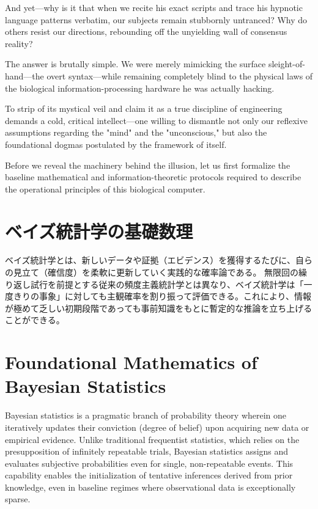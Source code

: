     And yet—why is it that when we recite his exact scripts and trace his hypnotic language patterns verbatim, our subjects remain stubbornly untranced? Why do others resist our directions, rebounding off the unyielding wall of consensus reality?

    The answer is brutally simple.
    We were merely mimicking the surface sleight-of-hand—the overt syntax—while remaining completely blind to the physical laws of the biological information-processing hardware he was actually hacking.

    To strip \abbrNLP of its mystical veil and claim it as a true discipline of engineering demands a cold, critical intellect—one willing to dismantle not only our reflexive assumptions regarding the "mind" and the "unconscious," but also the foundational dogmas postulated by the framework of \abbrNLP itself.

    Before we reveal the machinery behind the illusion, let us first formalize the baseline mathematical and information-theoretic protocols required to describe the operational principles of this biological computer.
\fi

\ifja
    \section{ベイズ統計学の基礎数理}
    ベイズ統計学とは、新しいデータや証拠（エビデンス）を獲得するたびに、自らの見立て（確信度）を柔軟に更新していく実践的な確率論である。
    無限回の繰り返し試行を前提とする従来の頻度主義統計学とは異なり、ベイズ統計学は「一度きりの事象」に対しても主観確率を割り振って評価できる。これにより、情報が極めて乏しい初期段階であっても事前知識をもとに暫定的な推論を立ち上げることができる。
\else
    \section{Foundational Mathematics of Bayesian Statistics}
    Bayesian statistics is a pragmatic branch of probability theory wherein one iteratively updates their conviction (degree of belief) upon acquiring new data or empirical evidence.
    Unlike traditional frequentist statistics, which relies on the presupposition of infinitely repeatable trials, Bayesian statistics assigns and evaluates subjective probabilities even for single, non-repeatable events. This capability enables the initialization of tentative inferences derived from prior knowledge, even in baseline regimes where observational data is exceptionally sparse.
\fi

